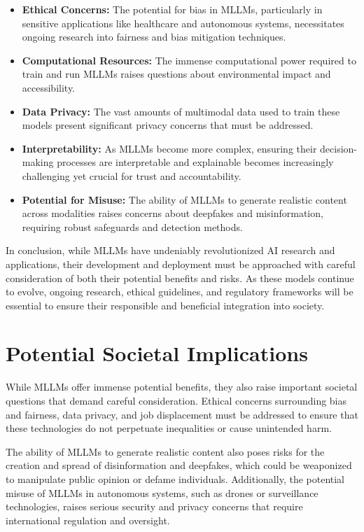 \begin{itemize}
    \item \textbf{Ethical Concerns:} The potential for bias in MLLMs, particularly in sensitive applications like healthcare and autonomous systems, necessitates ongoing research into fairness and bias mitigation techniques.
    \item \textbf{Computational Resources:} The immense computational power required to train and run MLLMs raises questions about environmental impact and accessibility.
    \item \textbf{Data Privacy:} The vast amounts of multimodal data used to train these models present significant privacy concerns that must be addressed.
    \item \textbf{Interpretability:} As MLLMs become more complex, ensuring their decision-making processes are interpretable and explainable becomes increasingly challenging yet crucial for trust and accountability.
    \item \textbf{Potential for Misuse:} The ability of MLLMs to generate realistic content across modalities raises concerns about deepfakes and misinformation, requiring robust safeguards and detection methods.
\end{itemize}

In conclusion, while MLLMs have undeniably revolutionized AI research and applications, their development and deployment must be approached with careful consideration of both their potential benefits and risks. As these models continue to evolve, ongoing research, ethical guidelines, and regulatory frameworks will be essential to ensure their responsible and beneficial integration into society.

\section{Potential Societal Implications}

While MLLMs offer immense potential benefits, they also raise important societal questions that demand careful consideration. Ethical concerns surrounding bias and fairness, data privacy, and job displacement must be addressed to ensure that these technologies do not perpetuate inequalities or cause unintended harm.

The ability of MLLMs to generate realistic content also poses risks for the creation and spread of disinformation and deepfakes, which could be weaponized to manipulate public opinion or defame individuals. Additionally, the potential misuse of MLLMs in autonomous systems, such as drones or surveillance technologies, raises serious security and privacy concerns that require international regulation and oversight.

